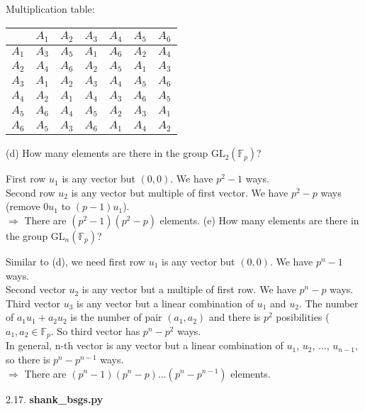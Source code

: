     Multiplication table:
    
    \begin{center}
        \begin{tabular}{|c||c|c|c|c|c|c|}
            \hline
            & $A_1$ & $A_2$ & $A_3$ & $A_4$ & $A_5$ & $A_6$ \\ \hline\hline
            $A_1$ & $A_3$ & $A_5$ & $A_1$ & $A_6$ & $A_2$ & $A_4$ \\ \hline
            $A_2$ & $A_4$ & $A_6$ & $A_2$ & $A_5$ & $A_1$ & $A_3$ \\ \hline
            $A_3$ & $A_1$ & $A_2$ & $A_3$ & $A_4$ & $A_5$ & $A_6$ \\ \hline
            $A_4$ & $A_2$ & $A_1$ & $A_4$ & $A_3$ & $A_6$ & $A_5$ \\ \hline
            $A_5$ & $A_6$ & $A_4$ & $A_5$ & $A_2$ & $A_3$ & $A_1$ \\ \hline
            $A_6$ & $A_5$ & $A_3$ & $A_6$ & $A_1$ & $A_4$ & $A_2$ \\
            \hline
        \end{tabular}
    \end{center}
(d) How many elements are there in the group $\text{GL}_2(\mathbb{F}_p)$?
    
    First row $u_1$ is any vector but $(0, 0)$. We have $p^2-1$ ways. \\ Second row $u_2$ is any vector but multiple of first vector. We have $p^2-p$ ways (remove $0u_1$ to $(p-1)u_1$). \\ $\Rightarrow$ There are $(p^2-1)(p^2-p)$ elements.
(e) How many elements are there in the group $\text{GL}_n(\mathbb{F}_p)$?
    
    Similar to (d), we need first row $u_1$ is any vector but $(0,0)$. We have $p^n-1$ ways. \\ Second vector $u_2$ is any vector but a multiple of first row. We have $p^n-p$ ways. \\ Third vector $u_3$ is any vector but a linear combination of $u_1$ and $u_2$. The number of $a_1u_1 + a_2u_2$ is the number of pair $(a_1, a_2)$ and there is $p^2$ posibilities ($a_1, a_2 \in \mathbb{F}_p$. So third vector has $p^n-p^2$ ways. \\ In general, n-th vector is any vector but a linear combination of $u_1$, $u_2$, ..., $u_{n-1}$, so there is $p^n-p^{n-1}$ ways. \\ $\Rightarrow$ There are $(p^n-1)(p^n-p)...(p^n-p^{n-1})$ elements.

2.17. \textbf{shank\_bsgs.py}

